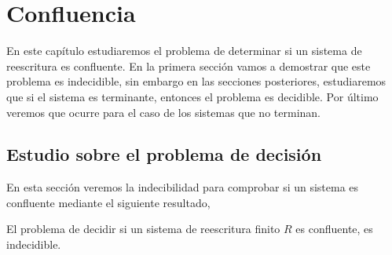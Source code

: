\chapter{Confluencia}

En este capítulo estudiaremos el problema de determinar si un sistema
de reescritura es confluente. En la primera sección vamos a demostrar
que este problema es indecidible, sin embargo en las secciones
posteriores, estudiaremos que si el sistema es terminante, entonces el
problema es decidible. Por último veremos que ocurre para el caso de
los sistemas que no terminan.

\section{Estudio sobre el problema de decisión}
  
En esta sección veremos la indecibilidad para comprobar si un sistema
es confluente mediante el siguiente resultado,

\begin{teor}
  El problema de decidir si un sistema de reescritura finito $R$ es
  confluente, es indecidible.
\end{teor}

